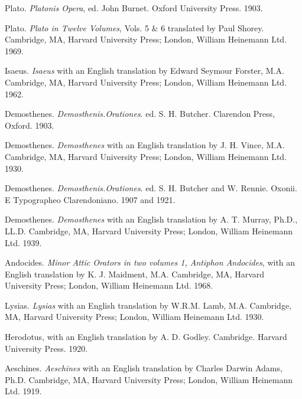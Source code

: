 \documentclass[a4paper,twocolumn,twoside,notitlepage,10pt]{article}
\begin{document}
\begin{description} %
    \item Plato. \emph{Platonis Opera}, ed. John Burnet. Oxford University Press. 1903.
    \item Plato. \emph{Plato in Twelve Volumes}, Vols. 5 \& 6 translated by Paul Shorey. Cambridge, MA, Harvard University Press; London, William Heinemann Ltd. 1969.

    \item Isaeus. \emph{Isaeus} with an English translation by Edward Seymour Forster, M.A. Cambridge, MA, Harvard University Press; London, William Heinemann Ltd. 1962.

    \item Demosthenes. \emph{Demosthenis.Orationes}. ed. S. H. Butcher. Clarendon Press, Oxford. 1903.
    \item Demosthenes. \emph{Demosthenes} with an English translation by J. H. Vince, M.A. Cambridge, MA, Harvard University Press; London, William Heinemann Ltd. 1930.

    \item Demosthenes. \emph{Demosthenis.Orationes}. ed. S. H. Butcher and W. Rennie. Oxonii. E Typographeo Clarendoniano. 1907 and 1921.
    \item Demosthenes. \emph{Demosthenes} with an English translation by A. T. Murray, Ph.D., LL.D. Cambridge, MA, Harvard University Press; London, William Heinemann Ltd. 1939.

    \item Andocides. \emph{Minor Attic Orators in two volumes 1, Antiphon Andocides}, with an English translation by K. J. Maidment, M.A. Cambridge, MA, Harvard University Press; London, William Heinemann Ltd. 1968.
    \item Lysias. \emph{Lysias} with an English translation by W.R.M. Lamb, M.A. Cambridge, MA, Harvard University Press; London, William Heinemann Ltd. 1930.
\end{description}

\begin{description} %
	\item Herodotus, with an English translation by A. D. Godley. Cambridge. Harvard University Press. 1920.
	\item Aeschines. \emph{Aeschines} with an English translation by Charles Darwin Adams, Ph.D. Cambridge, MA, Harvard University Press; London, William Heinemann Ltd. 1919.
\end{description}

\onecolumn
\printindex[eng]
\printindex[grc]
\end{document}
